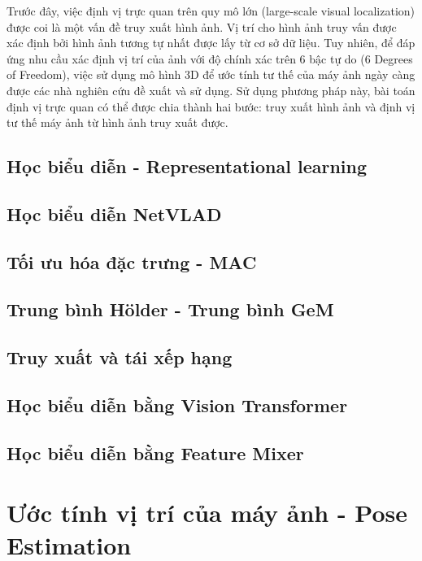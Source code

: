 Trước đây, việc định vị trực quan trên quy mô lớn (large-scale visual localization) được coi là một vấn đề truy xuất hình ảnh\cite{2022arXiv220105816X}. Vị trí cho hình ảnh truy vấn được xác định bởi hình ảnh tương tự nhất được lấy từ cơ sở dữ liệu. Tuy nhiên, để đáp ứng nhu cầu xác định vị trí của ảnh với độ chính xác trên 6 bậc tự do (6 Degrees of Freedom), việc sử dụng mô hình 3D để ước tính tư thế của máy ảnh ngày càng được các nhà nghiên cứu đề xuất và sử dụng. Sử dụng phương pháp này, bài toán định vị trực quan có thể được chia thành hai bước: truy xuất hình ảnh và định vị tư thế máy ảnh từ hình ảnh truy xuất được.

\subsection{Học biểu diễn - Representational learning}

\subsection{Học biểu diễn NetVLAD}

\subsection{Tối ưu hóa đặc trưng - MAC}

\subsection{Trung bình Hölder - Trung bình GeM}

\subsection{Truy xuất và tái xếp hạng}

\subsection{Học biểu diễn bằng Vision Transformer}

\subsection{Học biểu diễn bằng Feature Mixer}

\section{Ước tính vị trí của máy ảnh - Pose Estimation}


